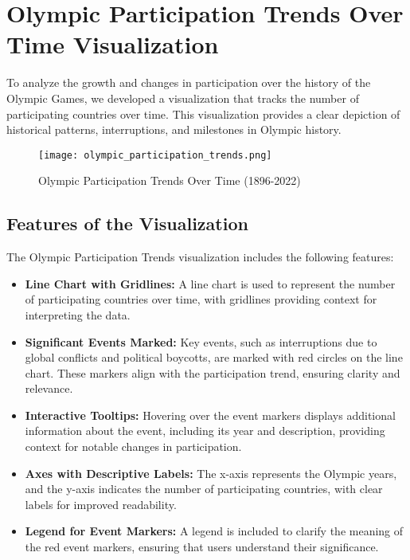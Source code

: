 \section{Olympic Participation Trends Over Time Visualization}

To analyze the growth and changes in participation over the history of the Olympic Games, we developed a visualization that tracks the number of participating countries over time. This visualization provides a clear depiction of historical patterns, interruptions, and milestones in Olympic history.

\begin{figure}[ht]
    \centering
    \texttt{[image: olympic\_participation\_trends.png]}
    \caption{Olympic Participation Trends Over Time (1896-2022)}
    \label{fig:participation_trends}
\end{figure}

\subsection{Features of the Visualization}
The Olympic Participation Trends visualization includes the following features:
\begin{itemize}
    \item \textbf{Line Chart with Gridlines:} A line chart is used to represent the number of participating countries over time, with gridlines providing context for interpreting the data.
    \item \textbf{Significant Events Marked:} Key events, such as interruptions due to global conflicts and political boycotts, are marked with red circles on the line chart. These markers align with the participation trend, ensuring clarity and relevance.
    \item \textbf{Interactive Tooltips:} Hovering over the event markers displays additional information about the event, including its year and description, providing context for notable changes in participation.
    \item \textbf{Axes with Descriptive Labels:} The x-axis represents the Olympic years, and the y-axis indicates the number of participating countries, with clear labels for improved readability.
    \item \textbf{Legend for Event Markers:} A legend is included to clarify the meaning of the red event markers, ensuring that users understand their significance.
\end{itemize}

